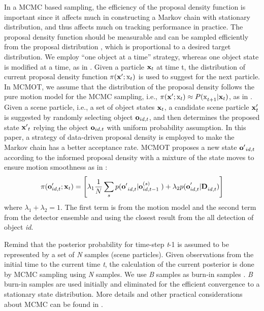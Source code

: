 \documentclass[runningheads]{llncs}
\begin{document}
In a MCMC based sampling, the efficiency of the proposal density function is important since it affects much in constructing a Markov chain with stationary distribution, and thus affects much on tracking performance in practice. The proposal density function should be measurable and can be sampled efficiently from the proposal distribution \cite{Ref2}, which is proportional to a desired target distribution. We employ ``one object at a time'' strategy, whereas one object state is modified at a time, as in \cite{Ref2,Ref7}. Given a particle ${\bf x}_{t} $ at time t, the distribution of current proposal density function $\pi {\rm (}{\bf x'};{\rm x}_{t} {\rm )}$ is used to suggest for the next particle. In MCMOT, we assume that the distribution of the proposal density follows the pure motion model for the MCMC sampling, i.e., $\pi {\rm (}{\bf x'};{\rm x}_{t} {\rm )}\approx P{\rm (x}_{t+1} |{\bf x}_{t} {\rm )}$, as in \cite{Ref2}. Given a scene particle, i.e., a set of object states ${\bf x}_{t} $, a candidate scene particle ${\bf x}'_{t} $ is suggested by randomly selecting object ${\bf o}_{id,t} $, and then determines the proposed state ${\bf x'}_{t} $ relying the object ${\bf o}_{id,t} $ with  uniform probability assumption. In this paper, a strategy of data-driven proposal density \cite{Ref3} is employed to make the Markov chain has a better acceptance rate. MCMOT proposes a new state ${\bf o'}_{id,t} $ according to the informed proposal density with a mixture of the state moves to ensure motion smoothness as in \cite{Ref6}: 
\begin{equation} \label{GrindEQ__2_} 
\pi {\rm (}{\bf o}'_{id,t};{\bf x}_{t} {\bf )}=\left[\lambda _{1} \frac{1}{N} \sum _{s}p{\bf (o'}_{id,t} {\bf |o}_{id,t-1}^{{\bf (}s{\bf )}} {\bf \; )}+\lambda _{2} p{\bf (o}'_{id,t} {\bf |D}_{id,t} {\bf )} \right] 
\end{equation} 
where $\lambda _{1} +\lambda _{2} =1$. The first term is from the motion model and the second term from the detector ensemble and using the closest result from the all detection of object \textit{id}. 

Remind that the posterior probability for time-step \textit{t}-1 is assumed to be represented by a set of \textit{N} samples (scene particles). Given observations from the initial time to the current time \textit{t}, the calculation of the current posterior is done by MCMC sampling using \textit{N} samples. We use \textit{B} samples as burn-in samples \cite{Ref6}. \textit{B} burn-in samples are used initially and eliminated for the efficient convergence to a stationary state distribution. More details and other practical considerations about MCMC can be found in \cite{Ref42}. 
\end{document}

